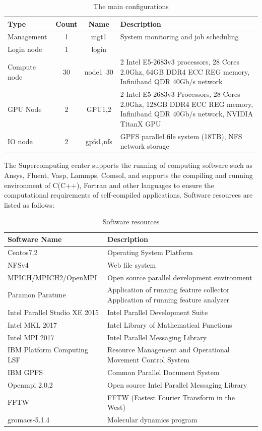 \documentclass[a4paper,12pt]{article}
\begin{document}
\begin{table}[H]
\centering
\caption{The main configurations}
\vspace{0.5cm}
\begin{tabular}{lccp{7cm}}  %
\toprule
Type & Count & Name & Description \\
\midrule
Management & 1 & mgt1 & System monitoring and job scheduling \\
Login node & 1 & login & \\
Compute node & 30 & node1~30 & 2 Intel E5-2683v3 processors, 28 Cores 2.0Ghz, 
64GB DDR4 ECC REG memory, Infiniband QDR 40Gb/s network \\
GPU Node & 2 & GPU1,2 & 2 Intel E5-2683v3 Processors, 28 Cores 2.0Ghz, 
128GB DDR4 ECC REG memory, Infiniband QDR 40Gb/s network, NVIDIA TitanX GPU \\
IO node & 2 & gpfs1,nfs & GPFS parallel file system (18TB), NFS network storage \\
\bottomrule
\end{tabular}
\end{table}

The Supercomputing center supports the running of computing software such as Ansys, Fluent, Vasp, Lammps, Comsol, and supports the compiling and running environment of C(C++), Fortran and other languages to ensure the computational requirements of self-compiled applications. Software resources are listed as follows:

\begin{table}[H]
\centering
\caption{Software resources}
\vspace{0.5cm}
\begin{tabular}{lp{8cm}}  %
\toprule
Software Name & Description \\
\midrule
Centos7.2 & Operating System Platform \\
NFSv4 & Web file system \\
MPICH/MPICH2/OpenMPI & Open source parallel development environment \\
Paramon Paratune & Application of running feature collector Application of running feature analyzer \\
Intel Parallel Studio XE 2015 & Intel Parallel Development Suite \\
Intel MKL 2017 & Intel Library of Mathematical Functions \\
Intel MPI 2017 & Intel Parallel Messaging Library \\
IBM Platform Computing LSF & Resource Management and Operational Movement Control System \\
IBM GPFS & Common Parallel Document System \\
Openmpi 2.0.2 & Open source Intel Parallel Messaging Library \\
FFTW & FFTW (Fastest Fourier Transform in the West) \\
gromacs-5.1.4 & Molecular dynamics program \\
\bottomrule
\end{tabular}
\end{table}
\end{document}
